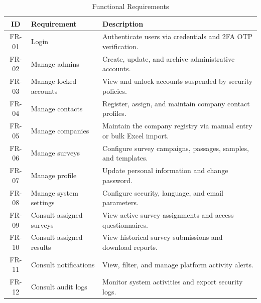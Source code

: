 \documentclass[12pt,a4paper]{report}
\begin{document}
\begin{table}[H]
\centering
\caption{Functional Requirements}
\label{tab:functional_requirements}
\vspace{0.3cm}
\renewcommand{\arraystretch}{1.2}
\begin{tabular}{|c|p{4.5cm}|p{8.5cm}|}
\hline
\textbf{ID} & \textbf{Requirement} & \textbf{Description} \\ \hline
FR-01 & Login & Authenticate users via credentials and 2FA OTP verification. \\ \hline
FR-02 & Manage admins & Create, update, and archive administrative accounts. \\ \hline
FR-03 & Manage locked accounts & View and unlock accounts suspended by security policies. \\ \hline
FR-04 & Manage contacts & Register, assign, and maintain company contact profiles. \\ \hline
FR-05 & Manage companies & Maintain the company registry via manual entry or bulk Excel import. \\ \hline
FR-06 & Manage surveys & Configure survey campaigns, passages, samples, and templates. \\ \hline
FR-07 & Manage profile & Update personal information and change password. \\ \hline
FR-08 & Manage system settings & Configure security, language, and email parameters. \\ \hline
FR-09 & Consult assigned surveys & View active survey assignments and access questionnaires. \\ \hline
FR-10 & Consult assigned results & View historical survey submissions and download reports. \\ \hline
FR-11 & Consult notifications & View, filter, and manage platform activity alerts. \\ \hline
FR-12 & Consult audit logs & Monitor system activities and export security logs. \\ \hline
\end{tabular}
\end{table}
\end{document}
